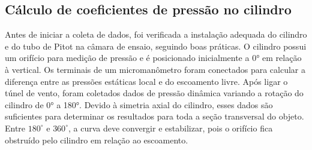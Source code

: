 \subsection{Cálculo de coeficientes de pressão no cilindro}



Antes de iniciar a coleta de dados, foi verificada a instalação adequada do cilindro e do tubo de Pitot na câmara de ensaio, seguindo boas práticas. O cilindro possui um orifício para medição de pressão e é posicionado inicialmente a 0° em relação à vertical. Os terminais de um micromanômetro foram conectados para calcular a diferença entre as pressões estáticas local e do escoamento livre. Após ligar o túnel de vento, foram coletados dados de pressão dinâmica variando a rotação do cilindro de 0° a 180°. Devido à simetria axial do cilindro, esses dados são suficientes para determinar os resultados para toda a seção transversal do objeto. Entre $180^\circ$ e $360^\circ$, a curva deve convergir e estabilizar, pois o orifício fica obstruído pelo cilindro em relação ao escoamento.

